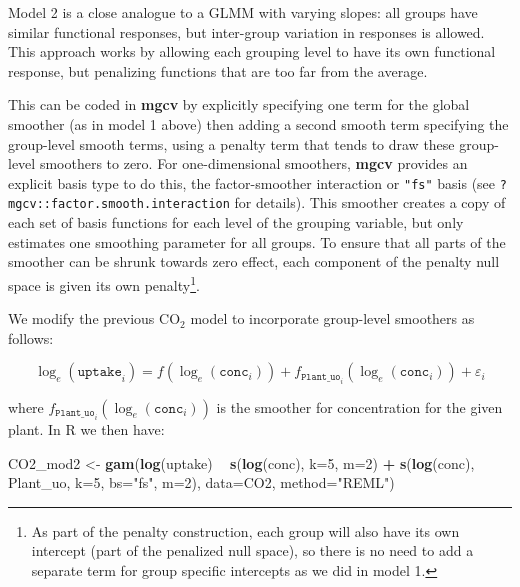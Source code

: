 \documentclass[12pt]{article}
\newenvironment{Shaded}{\begin{snugshade}}{\end{snugshade}}
\newcommand{\KeywordTok}[1]{\textcolor[rgb]{0.13,0.29,0.53}{\textbf{#1}}}
\newcommand{\DataTypeTok}[1]{\textcolor[rgb]{0.13,0.29,0.53}{#1}}
\newcommand{\DecValTok}[1]{\textcolor[rgb]{0.00,0.00,0.81}{#1}}
\newcommand{\StringTok}[1]{\textcolor[rgb]{0.31,0.60,0.02}{#1}}
\newcommand{\OperatorTok}[1]{\textcolor[rgb]{0.81,0.36,0.00}{\textbf{#1}}}
\newcommand{\NormalTok}[1]{#1}
\let\rmarkdownfootnote\footnote%
\def\footnote{\protect\rmarkdownfootnote}
\begin{document}
Model 2 is a close analogue to a GLMM with varying slopes: all groups
have similar functional responses, but inter-group variation in
responses is allowed. This approach works by allowing each grouping
level to have its own functional response, but penalizing functions that
are too far from the average.

This can be coded in \textbf{mgcv} by explicitly specifying one term for
the global smoother (as in model 1 above) then adding a second smooth
term specifying the group-level smooth terms, using a penalty term that
tends to draw these group-level smoothers to zero. For one-dimensional
smoothers, \textbf{mgcv} provides an explicit basis type to do this, the
factor-smoother interaction or \texttt{"fs"} basis (see
\texttt{?mgcv::factor.smooth.interaction} for details). This smoother
creates a copy of each set of basis functions for each level of the
grouping variable, but only estimates one smoothing parameter for all
groups. To ensure that all parts of the smoother can be shrunk towards
zero effect, each component of the penalty null space is given its own
penalty\footnote{As part of the penalty construction, each group will
  also have its own intercept (part of the penalized null space), so
  there is no need to add a separate term for group specific intercepts
  as we did in model 1.}.

We modify the previous \(\text{CO}_2\) model to incorporate group-level
smoothers as follows:

\[
\log_e(\texttt{uptake}_i) = f(\log_e(\texttt{conc}_i)) + f_{\texttt{Plant\_uo}_i}(\log_e(\texttt{conc}_i)) + \varepsilon_i
\]

where \(f_{\texttt{Plant\_uo}_i}(\log_e(\texttt{conc}_i))\) is the
smoother for concentration for the given plant. In R we then have:

\begin{Shaded}
\begin{Highlighting}[]
\NormalTok{CO2_mod2 <-}\StringTok{ }\KeywordTok{gam}\NormalTok{(}\KeywordTok{log}\NormalTok{(uptake) }\OperatorTok{~}\StringTok{ }\KeywordTok{s}\NormalTok{(}\KeywordTok{log}\NormalTok{(conc), }\DataTypeTok{k=}\DecValTok{5}\NormalTok{, }\DataTypeTok{m=}\DecValTok{2}\NormalTok{) }\OperatorTok{+}\StringTok{ }
\StringTok{                  }\KeywordTok{s}\NormalTok{(}\KeywordTok{log}\NormalTok{(conc), Plant_uo, }\DataTypeTok{k=}\DecValTok{5}\NormalTok{,  }\DataTypeTok{bs=}\StringTok{"fs"}\NormalTok{, }\DataTypeTok{m=}\DecValTok{2}\NormalTok{),}
                \DataTypeTok{data=}\NormalTok{CO2, }\DataTypeTok{method=}\StringTok{"REML"}\NormalTok{)}
\end{Highlighting}
\end{Shaded}
\end{document}
